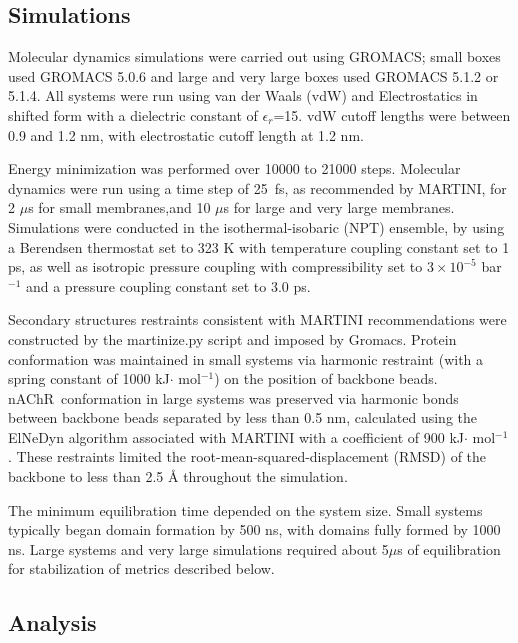 \documentclass[final,3p,times,twocolumn]{elsarticle}
\newcommand{\nachr}{nAChR}
\begin{document}
\subsection{Simulations}


Molecular dynamics simulations were carried out using GROMACS\cite{grom}; small boxes used GROMACS 5.0.6 and large {and very large} boxes used  GROMACS 5.1.2 or 5.1.4. All systems were run using van der Waals (vdW) and Electrostatics in shifted form with a dielectric constant of $\epsilon_r$=15. vdW cutoff lengths were between 0.9 and 1.2 nm, with electrostatic cutoff length at 1.2 nm.

Energy minimization was performed over 10000 to 21000 steps.  Molecular dynamics were run using a time step of 25~fs, as recommended by MARTINI, for 2 $\mu$s for {small membranes,and 10 $\mu$s for large and very large membranes}. Simulations were conducted in the isothermal-isobaric (NPT) ensemble, by using a Berendsen thermostat set to 323 K with temperature coupling constant set to  1 ps, as well as isotropic pressure coupling with compressibility set to $3\times 10^{-5}$ bar$^{-1}$ and a pressure coupling constant set to 3.0 ps. 


Secondary structures restraints consistent with MARTINI recommendations were constructed by the martinize.py \cite{martini} script {and} imposed by Gromacs\cite{grom}. Protein conformation was maintained in small systems via harmonic restraint (with a spring constant of 1000 kJ$\cdot$ mol$^{-1}$) on the position of backbone beads. \nachr~conformation in large systems was preserved via harmonic bonds between backbone beads separated by less than 0.5 nm, calculated using the ElNeDyn algorithm \cite{Periole_Combining_2009} associated with MARTINI\cite{martini}  with a coefficient of 900 kJ$\cdot$ mol$^{-1}$.  These restraints limited the root-mean-squared-displacement (RMSD) of the backbone to less than 2.5 \r{A} throughout the simulation.  

The minimum equilibration time depended on the system size. Small systems typically began domain formation by 500 ns, with domains fully formed by 1000 ns. Large systems and very large simulations required about 5$\mu$s of equilibration for stabilization of metrics described below.

\subsection{Analysis}
\end{document}
